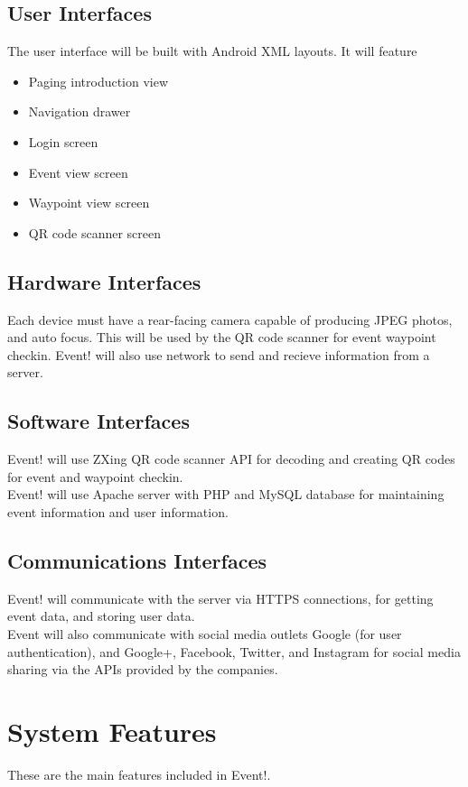 \documentclass{scrreprt}
\begin{document}
\section{User Interfaces}

The user interface will be built with Android XML layouts. It will feature
\begin{itemize}
\item Paging introduction view
\item Navigation drawer
\item Login screen
\item Event view screen
\item Waypoint view screen
\item QR code scanner screen
\end{itemize}

\section{Hardware Interfaces}
Each device must have a rear-facing camera capable of producing JPEG photos, 
and auto focus. This will be used by the QR code scanner for event waypoint checkin.
Event! will also use network to send and recieve information from a server.

\section{Software Interfaces}
Event! will use ZXing QR code scanner API for decoding and creating QR codes for 
event and waypoint checkin. \\
Event! will use Apache server with PHP and MySQL database for maintaining event 
information and user information.

\section{Communications Interfaces}
Event! will communicate with the server via HTTPS connections, for getting event 
data, and storing user data. \\
Event will also communicate with social media outlets Google (for user authentication), 
and Google+, Facebook, Twitter, and Instagram for social media sharing via the 
APIs provided by the companies.

\chapter{System Features}
These are the main features included in Event!.
\end{document}
